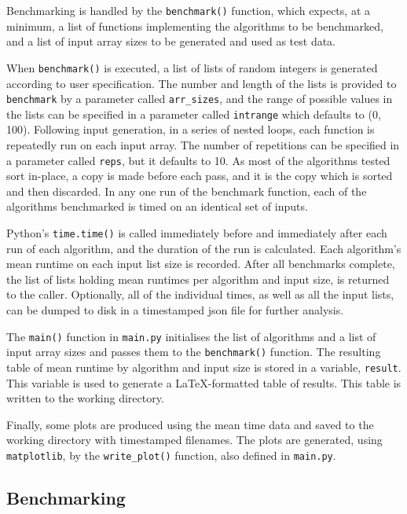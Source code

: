\documentclass[12pt, a4paper]{article}
\begin{document}
Benchmarking is handled by the \texttt{benchmark()} function, which expects, at a minimum, a list of functions implementing the algorithms to be benchmarked, and a list of input array sizes to be generated and used as test data.

When \texttt{benchmark()} is executed, a list of lists of random integers is generated according to user specification. The number and length of the lists is provided to \texttt{benchmark} by a parameter called \texttt{arr\_sizes}, and the range of possible values in the lists can be specified in a parameter called \texttt{intrange} which defaults to (0, 100). Following input generation, in a series of nested loops, each function is repeatedly run on each input array. The number of repetitions can be specified in a parameter called \texttt{reps}, but it defaults to 10. As most of the algorithms tested sort in-place, a copy is made before each pass, and it is the copy which is sorted and then discarded. In any one run of the benchmark function, each of the algorithms benchmarked is timed on an identical set of inputs.

Python's \texttt{time.time()} is called immediately before and immediately after each run of each algorithm, and the duration of the run is calculated. Each algorithm's mean runtime on each input list size is recorded. After all benchmarks complete, the list of lists holding mean runtimes per algorithm and input size, is returned to the caller. Optionally, all of the individual times, as well as all the input lists, can be dumped to disk in a timestamped json file for further analysis.

The \texttt{main()} function in \texttt{main.py} initialises the list of algorithms and a list of input array sizes and passes them to the \texttt{benchmark()} function. The resulting table of mean runtime by algorithm and input size is stored in a variable, \texttt{result}. This variable is used to generate a LaTeX-formatted table of results. This table is written to the working directory. 

Finally, some plots are produced using the mean time data and saved to the working directory with timestamped filenames. The plots are generated, using \texttt{matplotlib}, by the \texttt{write\_plot()} function, also defined in \texttt{main.py}.

\subsection{Benchmarking}\label{bench}
\end{document}
